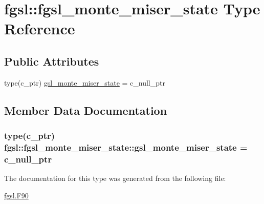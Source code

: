 \hypertarget{structfgsl_1_1fgsl__monte__miser__state}{\section{fgsl\-:\-:fgsl\-\_\-monte\-\_\-miser\-\_\-state Type Reference}
\label{structfgsl_1_1fgsl__monte__miser__state}
}
\subsection*{Public Attributes}
\begin{DoxyCompactItemize}
\item 
type(c\-\_\-ptr) \hyperlink{structfgsl_1_1fgsl__monte__miser__state_ad26a705d8454348d24dcb1b07b710677}{gsl\-\_\-monte\-\_\-miser\-\_\-state} = c\-\_\-null\-\_\-ptr
\end{DoxyCompactItemize}


\subsection{Member Data Documentation}
\hypertarget{structfgsl_1_1fgsl__monte__miser__state_ad26a705d8454348d24dcb1b07b710677}{
\subsubsection[{gsl\-\_\-monte\-\_\-miser\-\_\-state}]{\setlength{\rightskip}{0pt plus 5cm}type(c\-\_\-ptr) fgsl\-::fgsl\-\_\-monte\-\_\-miser\-\_\-state\-::gsl\-\_\-monte\-\_\-miser\-\_\-state = c\-\_\-null\-\_\-ptr}}\label{structfgsl_1_1fgsl__monte__miser__state_ad26a705d8454348d24dcb1b07b710677}


The documentation for this type was generated from the following file\-:\begin{DoxyCompactItemize}
\item 
\hyperlink{fgsl_8F90}{fgsl.\-F90}\end{DoxyCompactItemize}
